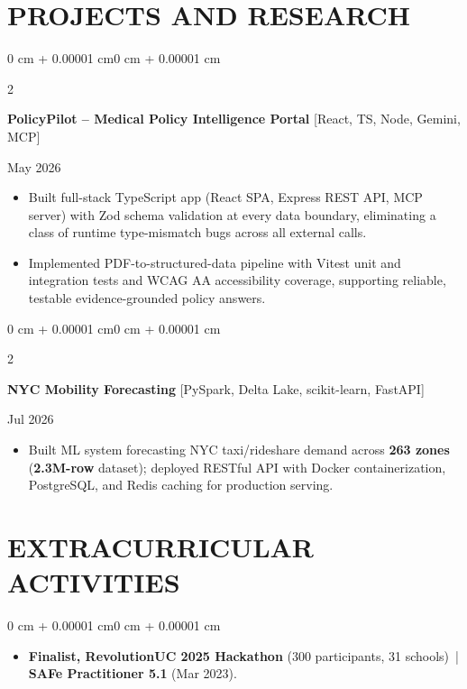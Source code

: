 \documentclass[10pt, letterpaper]{article}
\newenvironment{highlights}{
    \begin{itemize}[
        topsep=0.10 cm,
        parsep=0.06 cm,
        partopsep=0pt,
        itemsep=0.06 cm,
        leftmargin=12pt
    ]
}{
    \end{itemize}
}
\newenvironment{onecolentry}{
    \begin{adjustwidth}{0 cm + 0.00001 cm}{0 cm + 0.00001 cm}
}{
    \end{adjustwidth}
}
\newenvironment{twocolentry}[2][]{
    \onecolentry
    \def\secondColumn{#2}
    \setcolumnwidth{\fill, 4.5 cm}
    \begin{paracol}{2}
}{
    \switchcolumn \raggedleft \secondColumn
    \end{paracol}
    \endonecolentry
}
\begin{document}
\section{PROJECTS AND RESEARCH}
\begin{twocolentry}{May 2026}
\textbf{PolicyPilot -- Medical Policy Intelligence Portal} [React, TS, Node, Gemini, MCP]
\end{twocolentry}
\begin{highlights}
  \item Built full-stack TypeScript app (React SPA, Express REST API, MCP server) with Zod schema validation at every data boundary, eliminating a class of runtime type-mismatch bugs across all external calls.
  \item Implemented PDF-to-structured-data pipeline with Vitest unit and integration tests and WCAG AA accessibility coverage, supporting reliable, testable evidence-grounded policy answers.
\end{highlights}

\vspace{0.12 cm}

\begin{twocolentry}{Jul 2026}
\textbf{NYC Mobility Forecasting} [PySpark, Delta Lake, scikit-learn, FastAPI]
\end{twocolentry}
\begin{highlights}
  \item Built ML system forecasting NYC taxi/rideshare demand across \textbf{263 zones} (\textbf{2.3M-row} dataset); deployed RESTful API with Docker containerization, PostgreSQL, and Redis caching for production serving.
\end{highlights}

\section{EXTRACURRICULAR ACTIVITIES}
\begin{onecolentry}
\begin{highlights}
  \item \textbf{Finalist, RevolutionUC 2025 Hackathon} (300 participants, 31 schools) \,|\, \textbf{SAFe Practitioner 5.1} (Mar 2023).
\end{highlights}
\end{onecolentry}
\end{document}
